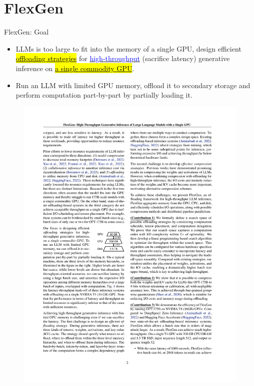 \section{FlexGen}
\begin{frame}{FlexGen: Goal}

\begin{itemize}
\item LLMs is too large to fit into the memory of a single GPU, design efficient \underline{\hl{offloading strategies}} for \underline{\textcolor{blue}{high-throughput}} (sacrifice latency) generative inference on \underline{\hl{a single commodity GPU}}.
\item Run an LLM with limited GPU memory, offload it to secondary storage and perform computation part-by-part by partially loading it.
\end{itemize}
\begin{figure}
    \centering
    \includegraphics[width=.3\textwidth]{./images/memory-system.pdf}
\end{figure}

\end{frame}

